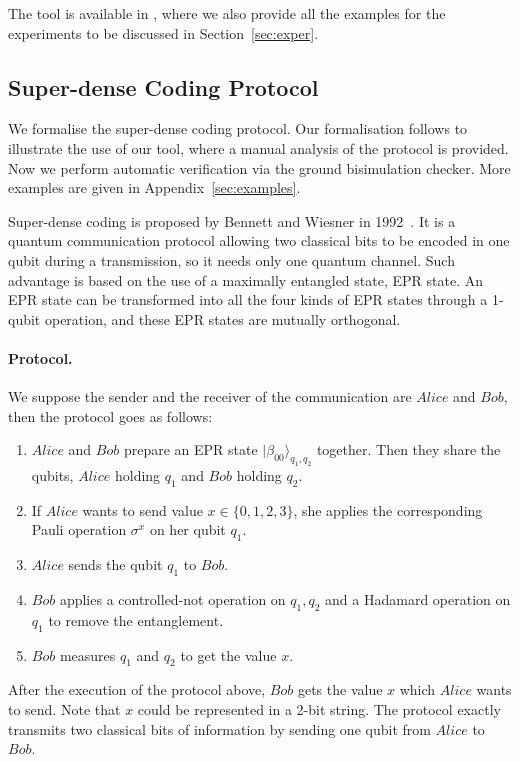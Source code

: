 \documentclass[a4paper,runningheads]{llncs}
\begin{document}
The tool is available in \cite{QBisim},
where we also provide all the examples for the experiments to be discussed in Section~\ref{sec:exper}. %

\subsection{Super-dense Coding Protocol}\label{sec:sdc}
We formalise the super-dense coding protocol. Our formalisation follows \cite{FDY14} to illustrate the use of our tool, where a manual analysis of the protocol is provided. Now we perform automatic verification via the ground bisimulation checker.
More examples are given in Appendix~\ref{sec:examples}.

Super-dense coding is proposed by Bennett and Wiesner in 1992~\cite{BW92}. It is a quantum communication protocol allowing two classical bits to be encoded in one qubit during a transmission, so it needs only one quantum channel. Such advantage is based on the use of a maximally
entangled state, EPR state. An EPR state can be transformed into all the four kinds of EPR states through a 1-qubit operation, and these EPR states are mutually orthogonal. 
\paragraph{Protocol.}
We suppose the sender and the receiver of the communication are $Alice$ and $Bob$, then the protocol goes as follows:
\begin{enumerate}
    \item $Alice$ and $Bob$ prepare an EPR state $|\beta_{00}\rangle_{q_1,q_2}$ together. Then they share the qubits, $Alice$ holding $q_1$ and $Bob$ holding $q_2$.
    \item If $Alice$ wants to send value $x\in \{0,1,2,3\}$, she applies the corresponding Pauli operation $\sigma^{x}$ on her qubit $q_1$.
    \item $Alice$ sends the qubit $q_1$ to $Bob$.
    \item $Bob$ applies a controlled-not operation on $q_1,q_2$ and a Hadamard operation on $q_1$ to remove the entanglement.
    \item $Bob$ measures $q_1$ and $q_2$ to get the value $x$.
\end{enumerate}
After the execution of the protocol above, $Bob$ gets the value $x$ which $Alice$ wants to send. Note that $x$ could be represented in a 2-bit string. The protocol exactly transmits two classical bits of information by sending one qubit from $Alice$ to $Bob$.
\end{document}
